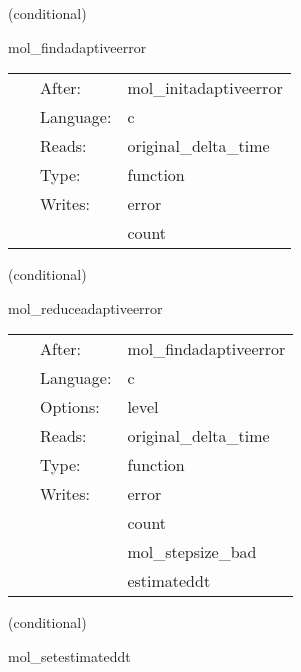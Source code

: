    (conditional) 

\hspace{5mm} mol\_findadaptiveerror 

\hspace{5mm}{\it control the step size: compute error check variables } 


\hspace{5mm}

 \begin{tabular*}{160mm}{cll} 
~ & After:  & mol\_initadaptiveerror \\ 
~ & Language:  & c \\ 
~ & Reads:  & original\_delta\_time \\ 
~ & Type:  & function \\ 
~ & Writes:  & error \\ 
~& ~ &count\\ 
\end{tabular*} 


\vspace{5mm}

   (conditional) 

\hspace{5mm} mol\_reduceadaptiveerror 

\hspace{5mm}{\it control the step size: reduce error check variables } 


\hspace{5mm}

 \begin{tabular*}{160mm}{cll} 
~ & After:  & mol\_findadaptiveerror \\ 
~ & Language:  & c \\ 
~ & Options:  & level \\ 
~ & Reads:  & original\_delta\_time \\ 
~ & Type:  & function \\ 
~ & Writes:  & error \\ 
~& ~ &count\\ 
~& ~ &mol\_stepsize\_bad\\ 
~& ~ &estimateddt\\ 
\end{tabular*} 


\vspace{5mm}

   (conditional) 

\hspace{5mm} mol\_setestimateddt 

